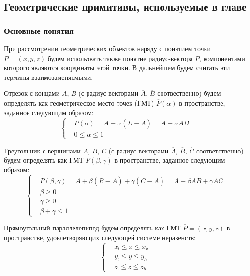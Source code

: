 \subsection{Геометрические примитивы, используемые в главе}

\subsubsection{Основные понятия}

При рассмотрении геометрических объектов наряду с понятием точки $P = (x, y, z)$ будем использвать также понятие радиус-вектора $\overline{P}$, компонентами которого являются координаты этой точки.
В дальнейшем будем считать эти термины взаимозаменяемыми.

Отрезок с концами $A$, $B$ (с радиус-векторами $\overline{A}$, $\overline{B}$ соотвественно) будем определять как геометрическое место точек\label{term:gmt} (ГМТ\label{abbr:gmt}) $\overline{P}(\alpha)$ в пространстве, заданное следующим образом:
\begin{equation}\label{eqn:text_1_geo_prim_segment}
	\left\{
		\begin{aligned}
			& \overline{P}(\alpha) = \overline{A} + \alpha (\overline{B} - \overline{A}) = \overline{A} + \alpha \overline{AB} \\
			& 0 \le \alpha \le 1
		\end{aligned}
	\right.
\end{equation}

Треугольник с вершинами $A$, $B$, $C$ (с радиус-векторами $\overline{A}$, $\overline{B}$, $\overline{C}$ соответственно) будем определять как ГМТ $\overline{P}(\beta, \gamma)$ в пространстве, заданное следующим образом:
\begin{equation}\label{eqn:text_1_geo_prim_triangle}
	\left\{
		\begin{aligned}
			& \overline{P}(\beta, \gamma) = \overline{A} + \beta (\overline{B} - \overline{A}) + \gamma (\overline{C} - \overline{A}) = \overline{A} + \beta \overline{AB} + \gamma \overline{AC} \\
			& \beta \ge 0 \\
			& \gamma \ge 0 \\
			& \beta + \gamma \le 1
		\end{aligned}
	\right.
\end{equation}

Прямоугольный параллелепипед будем определять как ГМТ $\overline{P} = (x, y, z)$ в пространстве, удовлетворяющих следующей системе неравенств:
\begin{equation}\label{eqn:text_1_geo_prim_parallelepiped}
	\left\{
		\begin{aligned}
			& x_l \le x \le x_h \\
			& y_l \le y \le y_h \\
			& z_l \le z \le z_h
		\end{aligned}
	\right.
\end{equation}

